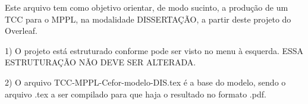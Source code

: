 







Este arquivo tem como objetivo orientar, de modo sucinto, a produção de um TCC para o MPPL, na modalidade DISSERTAÇÃO, a partir deste projeto do Overleaf.

1) O projeto está estruturado conforme pode ser visto no menu à esquerda. ESSA ESTRUTURAÇÃO NÃO DEVE SER ALTERADA.

2) O arquivo TCC-MPPL-Cefor-modelo-DIS.tex é a base do modelo, sendo o arquivo .tex a ser compilado para que haja o resultado no formato .pdf.

